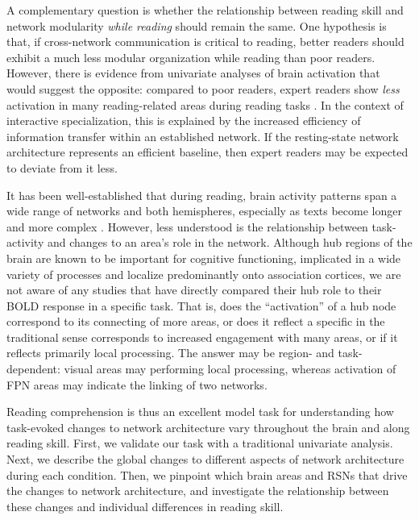 A complementary question is whether the relationship between reading skill and network modularity \textit{while reading} should remain the same. One hypothesis is that, if cross-network communication is critical to reading, better readers should exhibit a much less modular organization while reading than poor readers. However, there is evidence from univariate analyses of brain activation that would suggest the opposite: compared to poor readers, expert readers show \textit{less} activation in many reading-related areas during reading tasks \citep{Christodoulou2014}. In the context of interactive specialization, this is explained by the increased efficiency of information transfer within an established network. If the resting-state network architecture represents an efficient baseline, then expert readers may be expected to deviate from it less.

It has been well-established that during reading, brain activity patterns span a wide range of networks and both hemispheres, especially as texts become longer and more complex \citep{Rimrodt2009, Xu2005}. However, less understood is the relationship between task-activity and changes to an area's role in the network. Although hub regions of the brain are known to be important for cognitive functioning, implicated in a wide variety of processes and localize predominantly onto association cortices, we are not aware of any studies that have directly compared their hub role to their BOLD response in a specific task. That is, does the ``activation'' of a hub node correspond to its connecting of more areas, or does it reflect a specific in the traditional sense corresponds to increased engagement with many areas, or if it reflects primarily local processing. The answer may be region- and task-dependent: visual areas may performing local processing, whereas activation of FPN areas may indicate the linking of two networks. 

Reading comprehension is thus an excellent model task for understanding how task-evoked changes to network architecture vary throughout the brain and along reading skill. First, we validate our task with a traditional univariate analysis. Next, we describe the global changes to different aspects of network architecture during each condition. Then, we pinpoint which brain areas and RSNs that drive the changes to network architecture, and investigate the relationship between these changes and individual differences in reading skill. 


